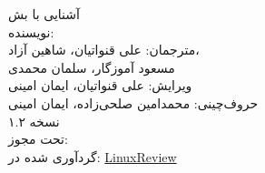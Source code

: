 \null
\vfill
{\noindent
آشنایی با بش \\
نویسنده:  \\
مترجمان:  علی قنواتیان، شاهین آزاد،\\
مسعود آموزگار، سلمان محمدی \\
ویرایش: علی قنواتیان، ایمان امینی \\
حروف‌چینی: محمدامین صلحی‌زاده، ایمان امینی \\
نسخه ۱.۲ \\
تحت مجوز:  \\
گردآوری شده در:
\href{http://linuxreview.ir/}{LinuxReview}
}

